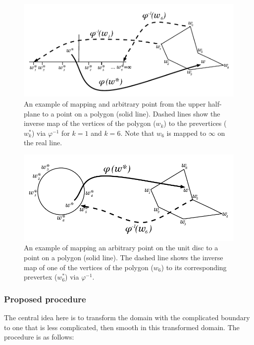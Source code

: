 \begin{figure} [t]
\centering
\includegraphics[scale=0.6]{sc/figs/reallinedia.pdf}
\caption{\label{cor-3s5}An example of mapping and arbitrary point from the upper half-plane to a point on a polygon (solid line). Dashed lines show the inverse map of the vertices of the polygon ($w_k$) to the prevertices ($w^*_k$) via $\varphi^{-1}$ for $k=1$ and $k=6$. Note that $w_6$ is mapped to $\infty$ on the real line.}
\label{reallinedia}
\end{figure}

\begin{figure} [t]
\centering
\includegraphics[scale=0.6]{sc/figs/unitdiskdia.pdf}
\caption{\label{cor-3s7}An example of mapping an arbitrary point on the unit disc to a point on a polygon (solid line). The dashed line shows the inverse map of one of the vertices of the polygon ($w_6$) to its corresponding prevertex ($w^*_6$) via $\varphi^{-1}$.}
\label{unitdiskdia}
\end{figure}

\subsubsection{Proposed procedure}

The central idea here is to transform the domain with the complicated boundary to one that is less complicated, then smooth in this transformed domain. The procedure is as follows:

